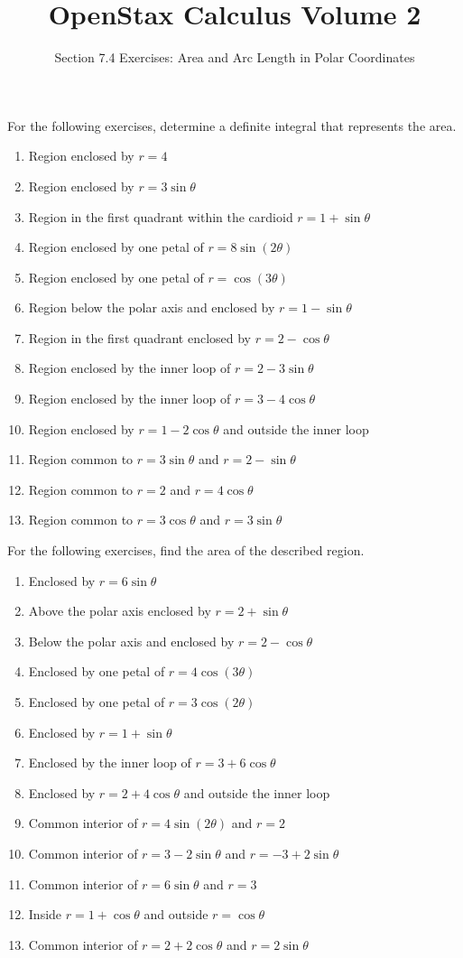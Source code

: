\documentclass{exercises}
\title{OpenStax Calculus Volume 2}
\subtitle{Section 7.4 Exercises: Area and Arc Length in Polar Coordinates}
\author{}
\date{}
\begin{document}
\maketitle


For the following exercises, determine a definite integral that represents the area.

\begin{enumerate}[start=1]
\item Region enclosed by $r=4$
\item Region enclosed by $r=3\sin \theta$
\item Region in the first quadrant within the cardioid $r=1+\sin \theta$
\item Region enclosed by one petal of $r=8\sin(2\theta)$
\item Region enclosed by one petal of $r=\cos(3\theta)$
\item Region below the polar axis and enclosed by $r=1-\sin \theta$
\item Region in the first quadrant enclosed by $r=2-\cos \theta$
\item Region enclosed by the inner loop of $r=2-3\sin \theta$
\item Region enclosed by the inner loop of $r=3-4\cos \theta$
\item Region enclosed by $r=1-2\cos \theta$ and outside the inner loop
\item Region common to $r=3\sin \theta$ and $r=2-\sin \theta$
\item Region common to $r=2$ and $r=4\cos \theta$
\item Region common to $r=3\cos \theta$ and $r=3\sin \theta$
\end{enumerate}

For the following exercises, find the area of the described region.

\begin{enumerate}[resume]
\item Enclosed by $r=6\sin \theta$
\item Above the polar axis enclosed by $r=2+\sin \theta$
\item Below the polar axis and enclosed by $r=2-\cos \theta$
\item Enclosed by one petal of $r=4\cos(3\theta)$
\item Enclosed by one petal of $r=3\cos(2\theta)$
\item Enclosed by $r=1+\sin \theta$
\item Enclosed by the inner loop of $r=3+6\cos \theta$
\item Enclosed by $r=2+4\cos \theta$ and outside the inner loop
\item Common interior of $r=4\sin(2\theta)$ and $r=2$
\item Common interior of $r=3-2\sin \theta$ and $r=-3+2\sin \theta$
\item Common interior of $r=6\sin \theta$ and $r=3$
\item Inside $r=1+\cos \theta$ and outside $r=\cos \theta$
\item Common interior of $r=2+2\cos \theta$ and $r=2\sin \theta$
\end{enumerate}
\end{document}
